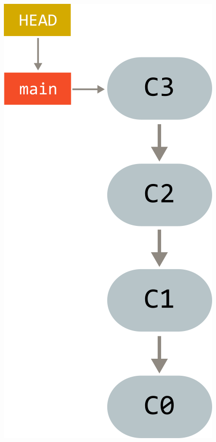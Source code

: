 \documentclass{article}
\begin{document}
\begin{minipage}{0.30\linewidth}
\begin{center}
\includegraphics[scale=0.85]{../images/four_commits.png}
\end{center}
\end{minipage}


\newpage
\end{document}
